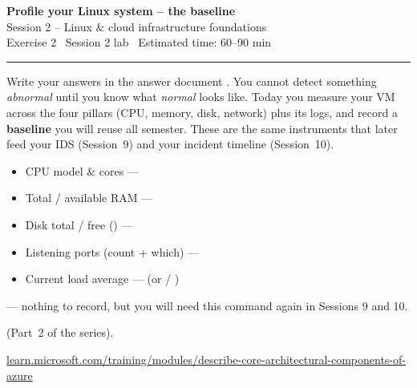 \documentclass[11pt]{article}
\begin{document}
\begin{center}
  {\LARGE\bfseries Profile your Linux system -- the baseline}\\[3pt]
  {\large Session 2 -- Linux \& cloud infrastructure foundations}\\[5pt]
  {\small Exercise 2 \textperiodcentered\ Session 2 lab \textperiodcentered\ Estimated time: 60--90 min}
\end{center}
\vspace{2pt}\hrule\vspace{1.1em}

Write your answers in the answer document . You cannot detect something \emph{abnormal} until you
know what \emph{normal} looks like. Today you measure your VM across the four pillars (CPU, memory,
disk, network) plus its logs, and record a \textbf{baseline} you will reuse all semester. These are
the same instruments that later feed your IDS (Session~9) and your incident timeline (Session~10).


 

\begin{itemize}
\item CPU model \& cores --- 
\item Total / available RAM --- 
\item Disk total / free (\cmd{/}) --- 
\item Listening ports (count + which) --- 
\item Current load average ---  (or  / )
\end{itemize}

  --- nothing to record, but you will
need this command again in Sessions 9 and 10.

 (Part~2 of the series).
\par\noindent\mbox{\href{https://learn.microsoft.com/training/modules/describe-core-architectural-components-of-azure/}{learn.microsoft.com/training/modules/describe-core-architectural-components-of-azure}}
\end{document}
